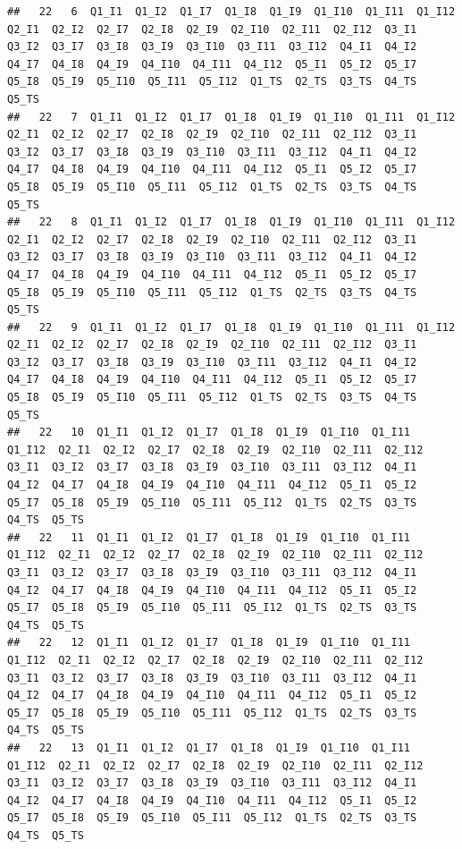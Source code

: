 \documentclass[]{book}
\begin{document}
\begin{verbatim}
##   22   6  Q1_I1  Q1_I2  Q1_I7  Q1_I8  Q1_I9  Q1_I10  Q1_I11  Q1_I12  Q2_I1  Q2_I2  Q2_I7  Q2_I8  Q2_I9  Q2_I10  Q2_I11  Q2_I12  Q3_I1  Q3_I2  Q3_I7  Q3_I8  Q3_I9  Q3_I10  Q3_I11  Q3_I12  Q4_I1  Q4_I2  Q4_I7  Q4_I8  Q4_I9  Q4_I10  Q4_I11  Q4_I12  Q5_I1  Q5_I2  Q5_I7  Q5_I8  Q5_I9  Q5_I10  Q5_I11  Q5_I12  Q1_TS  Q2_TS  Q3_TS  Q4_TS  Q5_TS
##   22   7  Q1_I1  Q1_I2  Q1_I7  Q1_I8  Q1_I9  Q1_I10  Q1_I11  Q1_I12  Q2_I1  Q2_I2  Q2_I7  Q2_I8  Q2_I9  Q2_I10  Q2_I11  Q2_I12  Q3_I1  Q3_I2  Q3_I7  Q3_I8  Q3_I9  Q3_I10  Q3_I11  Q3_I12  Q4_I1  Q4_I2  Q4_I7  Q4_I8  Q4_I9  Q4_I10  Q4_I11  Q4_I12  Q5_I1  Q5_I2  Q5_I7  Q5_I8  Q5_I9  Q5_I10  Q5_I11  Q5_I12  Q1_TS  Q2_TS  Q3_TS  Q4_TS  Q5_TS
##   22   8  Q1_I1  Q1_I2  Q1_I7  Q1_I8  Q1_I9  Q1_I10  Q1_I11  Q1_I12  Q2_I1  Q2_I2  Q2_I7  Q2_I8  Q2_I9  Q2_I10  Q2_I11  Q2_I12  Q3_I1  Q3_I2  Q3_I7  Q3_I8  Q3_I9  Q3_I10  Q3_I11  Q3_I12  Q4_I1  Q4_I2  Q4_I7  Q4_I8  Q4_I9  Q4_I10  Q4_I11  Q4_I12  Q5_I1  Q5_I2  Q5_I7  Q5_I8  Q5_I9  Q5_I10  Q5_I11  Q5_I12  Q1_TS  Q2_TS  Q3_TS  Q4_TS  Q5_TS
##   22   9  Q1_I1  Q1_I2  Q1_I7  Q1_I8  Q1_I9  Q1_I10  Q1_I11  Q1_I12  Q2_I1  Q2_I2  Q2_I7  Q2_I8  Q2_I9  Q2_I10  Q2_I11  Q2_I12  Q3_I1  Q3_I2  Q3_I7  Q3_I8  Q3_I9  Q3_I10  Q3_I11  Q3_I12  Q4_I1  Q4_I2  Q4_I7  Q4_I8  Q4_I9  Q4_I10  Q4_I11  Q4_I12  Q5_I1  Q5_I2  Q5_I7  Q5_I8  Q5_I9  Q5_I10  Q5_I11  Q5_I12  Q1_TS  Q2_TS  Q3_TS  Q4_TS  Q5_TS
##   22   10  Q1_I1  Q1_I2  Q1_I7  Q1_I8  Q1_I9  Q1_I10  Q1_I11  Q1_I12  Q2_I1  Q2_I2  Q2_I7  Q2_I8  Q2_I9  Q2_I10  Q2_I11  Q2_I12  Q3_I1  Q3_I2  Q3_I7  Q3_I8  Q3_I9  Q3_I10  Q3_I11  Q3_I12  Q4_I1  Q4_I2  Q4_I7  Q4_I8  Q4_I9  Q4_I10  Q4_I11  Q4_I12  Q5_I1  Q5_I2  Q5_I7  Q5_I8  Q5_I9  Q5_I10  Q5_I11  Q5_I12  Q1_TS  Q2_TS  Q3_TS  Q4_TS  Q5_TS
##   22   11  Q1_I1  Q1_I2  Q1_I7  Q1_I8  Q1_I9  Q1_I10  Q1_I11  Q1_I12  Q2_I1  Q2_I2  Q2_I7  Q2_I8  Q2_I9  Q2_I10  Q2_I11  Q2_I12  Q3_I1  Q3_I2  Q3_I7  Q3_I8  Q3_I9  Q3_I10  Q3_I11  Q3_I12  Q4_I1  Q4_I2  Q4_I7  Q4_I8  Q4_I9  Q4_I10  Q4_I11  Q4_I12  Q5_I1  Q5_I2  Q5_I7  Q5_I8  Q5_I9  Q5_I10  Q5_I11  Q5_I12  Q1_TS  Q2_TS  Q3_TS  Q4_TS  Q5_TS
##   22   12  Q1_I1  Q1_I2  Q1_I7  Q1_I8  Q1_I9  Q1_I10  Q1_I11  Q1_I12  Q2_I1  Q2_I2  Q2_I7  Q2_I8  Q2_I9  Q2_I10  Q2_I11  Q2_I12  Q3_I1  Q3_I2  Q3_I7  Q3_I8  Q3_I9  Q3_I10  Q3_I11  Q3_I12  Q4_I1  Q4_I2  Q4_I7  Q4_I8  Q4_I9  Q4_I10  Q4_I11  Q4_I12  Q5_I1  Q5_I2  Q5_I7  Q5_I8  Q5_I9  Q5_I10  Q5_I11  Q5_I12  Q1_TS  Q2_TS  Q3_TS  Q4_TS  Q5_TS
##   22   13  Q1_I1  Q1_I2  Q1_I7  Q1_I8  Q1_I9  Q1_I10  Q1_I11  Q1_I12  Q2_I1  Q2_I2  Q2_I7  Q2_I8  Q2_I9  Q2_I10  Q2_I11  Q2_I12  Q3_I1  Q3_I2  Q3_I7  Q3_I8  Q3_I9  Q3_I10  Q3_I11  Q3_I12  Q4_I1  Q4_I2  Q4_I7  Q4_I8  Q4_I9  Q4_I10  Q4_I11  Q4_I12  Q5_I1  Q5_I2  Q5_I7  Q5_I8  Q5_I9  Q5_I10  Q5_I11  Q5_I12  Q1_TS  Q2_TS  Q3_TS  Q4_TS  Q5_TS

\end{verbatim}
\end{document}
